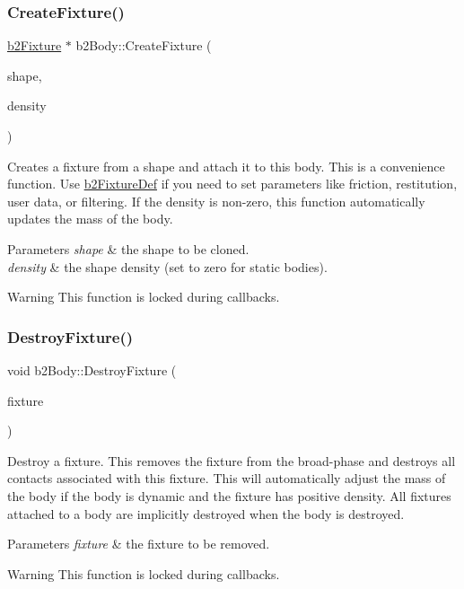 \subsubsection{\texorpdfstring{Create\+Fixture()}{CreateFixture()}\hspace{0.1cm}{\footnotesize\ttfamily [2/2]}}
{\footnotesize\ttfamily \hyperlink{classb2_fixture}{b2\+Fixture} $\ast$ b2\+Body\+::\+Create\+Fixture (\begin{DoxyParamCaption}\item[{const \hyperlink{classb2_shape}{b2\+Shape} $\ast$}]{shape,  }\item[{float32}]{density }\end{DoxyParamCaption})}

Creates a fixture from a shape and attach it to this body. This is a convenience function. Use \hyperlink{structb2_fixture_def}{b2\+Fixture\+Def} if you need to set parameters like friction, restitution, user data, or filtering. If the density is non-\/zero, this function automatically updates the mass of the body. 
\begin{DoxyParams}{Parameters}
{\em shape} & the shape to be cloned. \\
\hline
{\em density} & the shape density (set to zero for static bodies). \\
\hline
\end{DoxyParams}
\begin{DoxyWarning}{Warning}
This function is locked during callbacks. 
\end{DoxyWarning}
\mbox{\label{classb2_body_a856d1df86b7bded91f02d8cfcaea1c2f}} 
\subsubsection{\texorpdfstring{Destroy\+Fixture()}{DestroyFixture()}}
{\footnotesize\ttfamily void b2\+Body\+::\+Destroy\+Fixture (\begin{DoxyParamCaption}\item[{\hyperlink{classb2_fixture}{b2\+Fixture} $\ast$}]{fixture }\end{DoxyParamCaption})}

Destroy a fixture. This removes the fixture from the broad-\/phase and destroys all contacts associated with this fixture. This will automatically adjust the mass of the body if the body is dynamic and the fixture has positive density. All fixtures attached to a body are implicitly destroyed when the body is destroyed. 
\begin{DoxyParams}{Parameters}
{\em fixture} & the fixture to be removed. \\
\hline
\end{DoxyParams}
\begin{DoxyWarning}{Warning}
This function is locked during callbacks. 
\end{DoxyWarning}
\mbox{\label{classb2_body_a20b9c8d0d722edf3af281034d37bd534}} 
